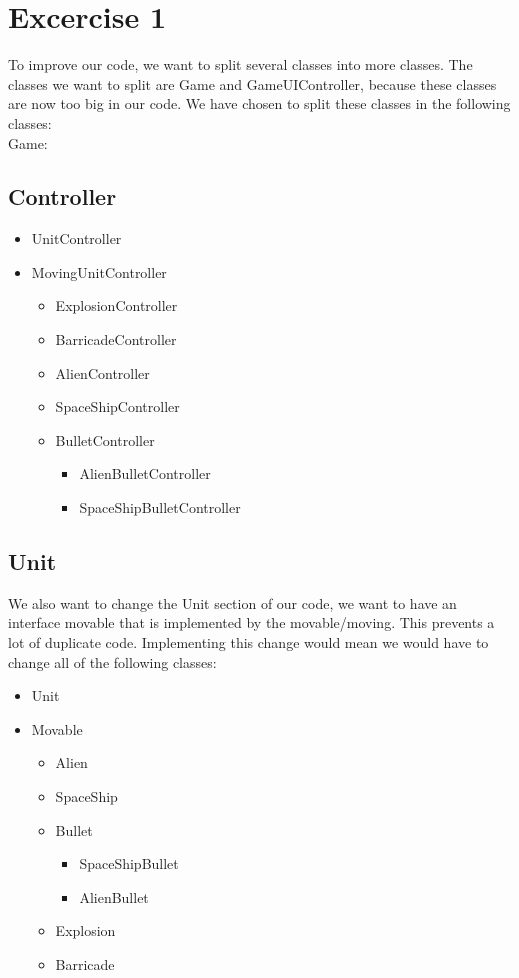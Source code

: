 \documentclass[10pt]{article}
\begin{document}
\section*{Excercise 1}
To improve our code, we want to split several classes into more classes. The classes we want to split are Game and GameUIController, because these classes are now too big in our code. We have chosen to split these classes in the following classes:\\
Game:\newline
\subsection*{Controller}
\begin{itemize}
	\item UnitController
	\item MovingUnitController
	\begin{itemize}
	\item ExplosionController
	\item BarricadeController	
	\item AlienController
	\item SpaceShipController
	\item BulletController
		\begin{itemize}
			\item AlienBulletController
			\item SpaceShipBulletController
		\end{itemize}
	\end{itemize}
\end{itemize}
\subsection*{Unit}
We also want to change the Unit section of our code, we want to have an interface movable that is implemented by the movable/moving. This prevents a lot of duplicate code. Implementing this change would mean we would have to change all of the following classes:
	\begin{itemize}
	\item Unit
	\item Movable
		\begin{itemize}
		\item Alien
		\item SpaceShip
		\item Bullet
		\begin{itemize}
			\item SpaceShipBullet
			\item AlienBullet
		\end{itemize}
		\item Explosion
		\item Barricade
	\end{itemize}
\end{itemize}
\end{document}
